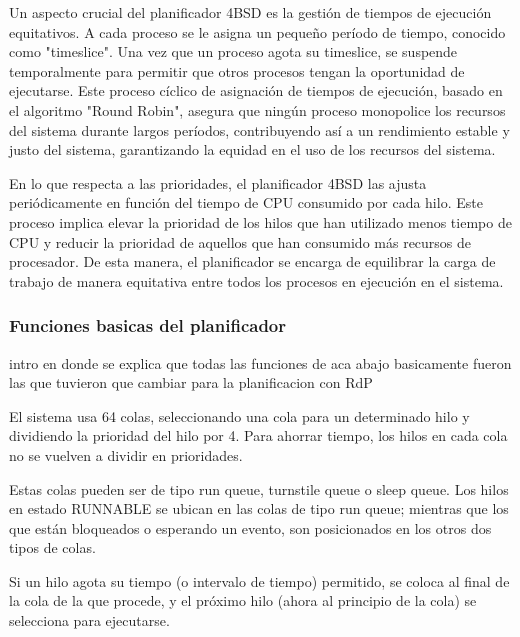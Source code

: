 Un aspecto crucial del planificador 4BSD es la gestión de tiempos de ejecución equitativos. A cada proceso se le asigna un pequeño período de tiempo, conocido como "timeslice". Una vez que un proceso agota su timeslice, se suspende temporalmente para permitir que otros procesos tengan la oportunidad de ejecutarse. Este proceso cíclico de asignación de tiempos de ejecución, basado en el algoritmo "Round Robin", asegura que ningún proceso monopolice los recursos del sistema durante largos períodos, contribuyendo así a un rendimiento estable y justo del sistema,  garantizando la equidad en el uso de los recursos del sistema.\par

En lo que respecta a las prioridades, el planificador 4BSD las ajusta periódicamente en función del tiempo de CPU consumido por cada hilo. Este proceso implica elevar la prioridad de los hilos que han utilizado menos tiempo de CPU y reducir la prioridad de aquellos que han consumido más recursos de procesador. De esta manera, el planificador se encarga de equilibrar la carga de trabajo de manera equitativa entre todos los procesos en ejecución en el sistema.\par


\subsubsection*{Funciones basicas del planificador}

intro en donde se explica que todas las funciones de aca abajo basicamente fueron las que tuvieron que cambiar para la planificacion con RdP

El sistema usa 64 colas, seleccionando una cola para un determinado hilo y dividiendo la prioridad del hilo por 4. Para ahorrar tiempo, los hilos en cada cola no se vuelven a dividir en prioridades.\par

Estas colas pueden ser de tipo run queue, turnstile queue o sleep queue. Los hilos en estado RUNNABLE se ubican en las colas de tipo run queue; mientras que los que están bloqueados o esperando un evento, son posicionados en los otros dos tipos de colas.\par

Si un hilo agota su tiempo (o intervalo de tiempo) permitido, se coloca al final de la cola de la que procede, y el próximo hilo (ahora al principio de la cola) se selecciona para ejecutarse.\par

